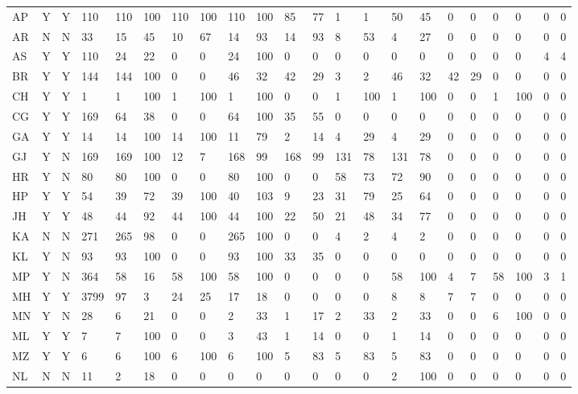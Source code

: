 \documentclass[a4paper, 12pt, twoside]{article}
\begin{document}
\begin{landscape}
\begin{longtable}{>{\raggedright}p{2cm}p{0.5cm}p{0.5cm}p{0.5cm}p{0.5cm}p{0.5cm}p{0.5cm}p{0.5cm}p{0.5cm}p{0.5cm}p{0.5cm}p{1.0cm}p{0.5cm}p{0.5cm}p{0.5cm}p{0.5cm}p{0.5cm}p{0.5cm}p{0.5cm}p{0.5cm}p{0.5cm}p{0.5cm}}
AP & Y & Y & 110 & 110 & 100 & 110 & 100 & 110 & 100 & 85 & 77 & 1 & 1 & 50 & 45 & 0 & 0 & 0 & 0 & 0 & 0 \\
AR & N & N & 33 & 15 & 45 & 10 & 67 & 14 & 93 & 14 & 93 & 8 & 53 & 4 & 27 & 0 & 0 & 0 & 0 & 0 & 0 \\
AS & Y & Y & 110 & 24 & 22 & 0 & 0 & 24 & 100 & 0 & 0 & 0 & 0 & 0 & 0 & 0 & 0 & 0 & 0 & 4 & 4 \\
BR & Y & Y & 144 & 144 & 100 & 0 & 0 & 46 & 32 & 42 & 29 & 3 & 2 & 46 & 32 & 42 & 29 & 0 & 0 & 0 & 0 \\
CH & Y & Y & 1 & 1 & 100 & 1 & 100 & 1 & 100 & 0 & 0 & 1 & 100 & 1 & 100 & 0 & 0 & 1 & 100 & 0 & 0 \\
CG & Y & Y & 169 & 64 & 38 & 0 & 0 & 64 & 100 & 35 & 55 & 0 & 0 & 0 & 0 & 0 & 0 & 0 & 0 & 0 & 0 \\
GA & Y & Y & 14 & 14 & 100 & 14 & 100 & 11 & 79 & 2 & 14 & 4 & 29 & 4 & 29 & 0 & 0 & 0 & 0 & 0 & 0 \\
GJ & Y & N & 169 & 169 & 100 & 12 & 7 & 168 & 99 & 168 & 99 & 131 & 78 & 131 & 78 & 0 & 0 & 0 & 0 & 0 & 0 \\
HR & Y & N & 80 & 80 & 100 & 0 & 0 & 80 & 100 & 0 & 0 & 58 & 73 & 72 & 90 & 0 & 0 & 0 & 0 & 0 & 0 \\
HP & Y & Y & 54 & 39 & 72 & 39 & 100 & 40 & 103 & 9 & 23 & 31 & 79 & 25 & 64 & 0 & 0 & 0 & 0 & 0 & 0 \\
JH & Y & Y & 48 & 44 & 92 & 44 & 100 & 44 & 100 & 22 & 50 & 21 & 48 & 34 & 77 & 0 & 0 & 0 & 0 & 0 & 0 \\
KA & N & N & 271 & 265 & 98 & 0 & 0 & 265 & 100 & 0 & 0 & 4 & 2 & 4 & 2 & 0 & 0 & 0 & 0 & 0 & 0 \\
KL & Y & N & 93 & 93 & 100 & 0 & 0 & 93 & 100 & 33 & 35 & 0 & 0 & 0 & 0 & 0 & 0 & 0 & 0 & 0 & 0 \\
MP & Y & N & 364 & 58 & 16 & 58 & 100 & 58 & 100 & 0 & 0 & 0 & 0 & 58 & 100 & 4 & 7 & 58 & 100 & 3 & 1 \\
MH & Y & Y & 3799 & 97 & 3 & 24 & 25 & 17 & 18 & 0 & 0 & 0 & 0 & 8 & 8 & 7 & 7 & 0 & 0 & 0 & 0 \\
MN & Y & N & 28 & 6 & 21 & 0 & 0 & 2 & 33 & 1 & 17 & 2 & 33 & 2 & 33 & 0 & 0 & 6 & 100 & 0 & 0 \\
ML & Y & Y & 7 & 7 & 100 & 0 & 0 & 3 & 43 & 1 & 14 & 0 & 0 & 1 & 14 & 0 & 0 & 0 & 0 & 0 & 0 \\
MZ & Y & Y & 6 & 6 & 100 & 6 & 100 & 6 & 100 & 5 & 83 & 5 & 83 & 5 & 83 & 0 & 0 & 0 & 0 & 0 & 0 \\
NL & N & N & 11 & 2 & 18 & 0 & 0 & 0 & 0 & 0 & 0 & 0 & 0 & 2 & 100 & 0 & 0 & 0 & 0 & 0 & 0 \\

\end{longtable}
\end{landscape}
\end{document}
